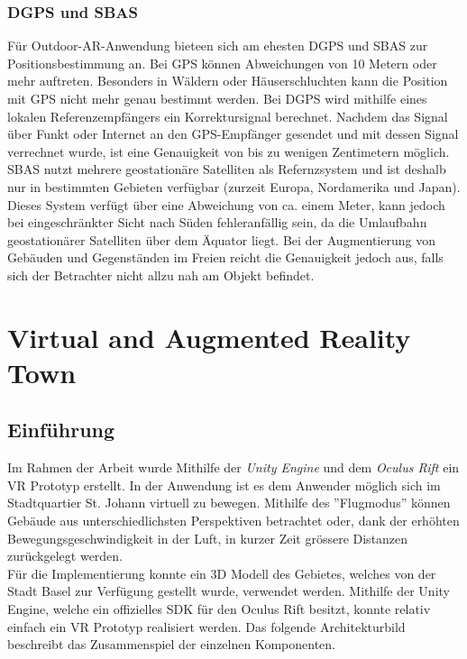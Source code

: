 \subsection*{DGPS und SBAS}
Für Outdoor-AR-Anwendung bieteen sich am ehesten DGPS und SBAS zur Positionsbestimmung an. Bei GPS können Abweichungen von 10 Metern oder mehr auftreten. Besonders in Wäldern oder Häuserschluchten kann die Position mit GPS nicht mehr genau bestimmt werden. Bei DGPS wird mithilfe eines lokalen Referenzempfängers ein Korrektursignal berechnet. Nachdem das Signal über Funkt oder Internet an den GPS-Empfänger gesendet und mit dessen Signal verrechnet wurde, ist eine Genauigkeit von bis zu wenigen Zentimetern möglich.\\[6pt]
SBAS nutzt mehrere geostationäre Satelliten als Refernzsystem und ist deshalb nur in bestimmten Gebieten verfügbar (zurzeit Europa, Nordamerika und Japan). Dieses System verfügt über eine Abweichung von ca. einem Meter, kann jedoch bei eingeschränkter Sicht nach Süden fehleranfällig sein, da die Umlaufbahn geostationärer Satelliten über dem Äquator liegt. Bei der Augmentierung von Gebäuden und Gegenständen im Freien reicht die Genauigkeit jedoch aus, falls sich der Betrachter nicht allzu nah am Objekt befindet.\cite[S.~253~ff.]{doerner13}

\chapter{Virtual and Augmented Reality Town}\label{c.towndemo}
\vspace{-20pt}
\section{Einführung}\label{s.vrintro}
Im Rahmen der Arbeit wurde Mithilfe der \textit{Unity Engine} und dem \textit{Oculus Rift} ein VR Prototyp erstellt. In der Anwendung ist es dem Anwender möglich sich im Stadtquartier St. Johann virtuell zu bewegen. Mithilfe des ''Flugmodus'' können Gebäude aus unterschiedlichsten Perspektiven betrachtet oder, dank der erhöhten Bewegungsgeschwindigkeit in der Luft, in kurzer Zeit grössere Distanzen zurückgelegt werden.\\[6pt]
Für die Implementierung konnte ein 3D Modell des Gebietes, welches von der Stadt Basel zur Verfügung gestellt wurde, verwendet werden. Mithilfe der Unity Engine, welche ein offizielles SDK für den Oculus Rift besitzt, konnte relativ einfach ein VR Prototyp realisiert werden. Das folgende Architekturbild beschreibt das Zusammenspiel der einzelnen Komponenten.

